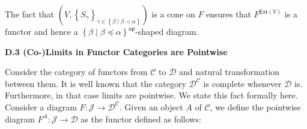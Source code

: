 \documentclass[10pt,a4paper]{article}
\begin{document}
\begin{center}\end{center}
 
The fact that $(V,\left\{S_{\gamma}\right\}_{\gamma\in\left\{\beta\middle|\beta\prec\alpha\right\}})$ is a cone on $F$ ensures that $F^{\mathsf{Ext}(V)}$ is a functor and hence a ${\left\{\beta\middle|\beta\preceq\alpha\right\}}^{\mathsf{op}}$-shaped diagram.\par
 
 
 
 
\par\medskip\noindent\textbf{D.3 (Co-)Limits in Functor Categories are Pointwise}\par
 
 
Consider the category of functors from $\mathcal{C}$ to $\mathcal{D}$ and natural transformation between them. It is well known that the category $\mathcal{D}^{\mathcal{C}}$ is complete whenever $\mathcal{D}$ is. Furthermore, in that case limits are pointwise. We state this fact formally here. Consider a diagram $F:\mathcal{J}\to\mathcal{D}^{\mathcal{C}}$. Given an object $A$ of $\mathcal{C}$, we define the pointwise diagram $F^{A}:\mathcal{J}\to\mathcal{D}$ as the functor defined as follows:\par
 
\begin{center}\end{center}
 
\end{document}

